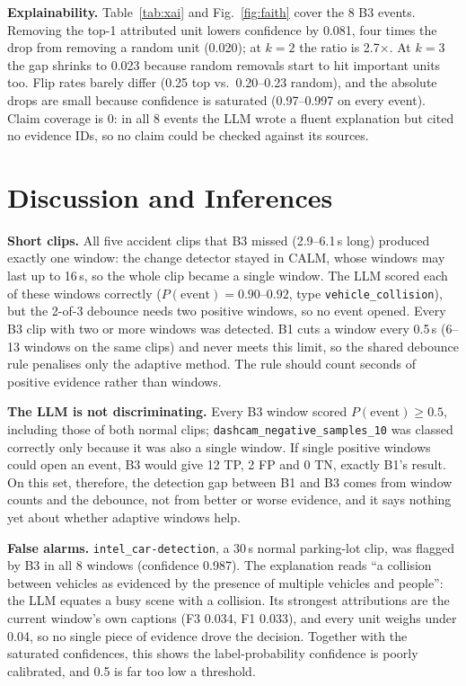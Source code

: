 \documentclass[conference]{IEEEtran}
\begin{document}
\textbf{Explainability.} Table~\ref{tab:xai} and Fig.~\ref{fig:faith} cover the 8 B3 events. Removing the
top-1 attributed unit lowers confidence by 0.081, four times the drop from removing a random unit (0.020);
at $k=2$ the ratio is 2.7$\times$. At $k=3$ the gap shrinks to 0.023 because random removals start to hit
important units too. Flip rates barely differ (0.25 top vs.\ 0.20--0.23 random), and the absolute drops are
small because confidence is saturated (0.97--0.997 on every event). Claim coverage is 0: in all 8 events the
LLM wrote a fluent explanation but cited no evidence IDs, so no claim could be checked against its sources.

\section{Discussion and Inferences}\label{sec:disc}
\textbf{Short clips.} All five accident clips that B3 missed (2.9--6.1\,s long) produced exactly one window:
the change detector stayed in CALM, whose windows may last up to 16\,s, so the whole clip became a single
window. The LLM scored each of these windows correctly ($P(\text{event})=0.90$--$0.92$, type
\texttt{vehicle\_collision}), but the 2-of-3 debounce needs two positive windows, so no event opened. Every
B3 clip with two or more windows was detected. B1 cuts a window every 0.5\,s (6--13 windows on the same
clips) and never meets this limit, so the shared debounce rule penalises only the adaptive method. The rule
should count seconds of positive evidence rather than windows.

\textbf{The LLM is not discriminating.} Every B3 window scored $P(\text{event})\ge0.5$, including those of
both normal clips; \texttt{dashcam\_negative\_samples\_10} was classed correctly only because it was also a
single window. If single positive windows could open an event, B3 would give 12 TP, 2 FP and 0 TN, exactly
B1's result. On this set, therefore, the detection gap between B1 and B3 comes from window counts and the
debounce, not from better or worse evidence, and it says nothing yet about whether adaptive windows help.

\textbf{False alarms.} \texttt{intel\_car-detection}, a 30\,s normal parking-lot clip, was flagged by B3 in all
8 windows (confidence 0.987). The explanation reads ``a collision between vehicles as evidenced by the
presence of multiple vehicles and people'': the LLM equates a busy scene with a collision. Its strongest
attributions are the current window's own captions (F3 0.034, F1 0.033), and every unit weighs under 0.04,
so no single piece of evidence drove the decision. Together with the saturated confidences, this shows the
label-probability confidence is poorly calibrated, and 0.5 is far too low a threshold.
\end{document}
